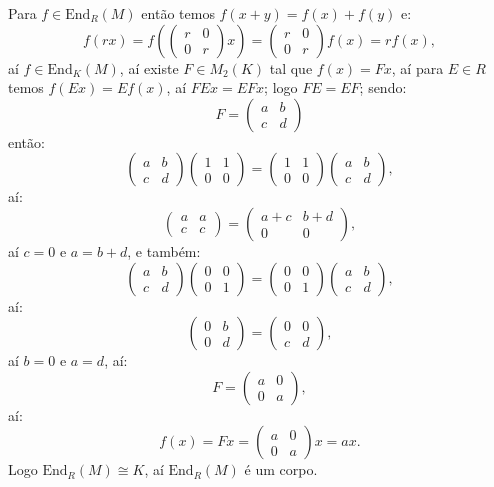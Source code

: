 \documentclass[10pt,a4paper]{article}
\begin{document}
\medskip
\noindent
Para $f\in\mathrm{End}_R(M)$ então temos $f(x+y)=f(x)+f(y)$ e:
\[
f(rx)=f\left(\begin{pmatrix}
r&0\\0&r
\end{pmatrix}x\right)=\begin{pmatrix}
r&0\\0&r
\end{pmatrix}f(x)=rf(x),
\]
aí $f\in\mathrm{End}_K(M)$, aí existe $F\in M_2(K)$ tal que $f(x)=Fx$, aí para $E\in R$ temos $f(Ex)=Ef(x)$, aí $FEx=EFx$; logo $FE=EF$; sendo:
\[
F=\begin{pmatrix}
a&b\\c&d
\end{pmatrix}
\]
então:
\[
\begin{pmatrix}
a&b\\c&d
\end{pmatrix}\begin{pmatrix}
1&1\\0&0
\end{pmatrix}=\begin{pmatrix}
1&1\\0&0
\end{pmatrix}\begin{pmatrix}
a&b\\c&d
\end{pmatrix},
\]
aí:
\[
\begin{pmatrix}
a&a\\c&c
\end{pmatrix}=
\begin{pmatrix}
a+c&b+d\\0&0
\end{pmatrix},
\]
aí $c=0$ e $a=b+d$, e também:
\[
\begin{pmatrix}
a&b\\c&d
\end{pmatrix}\begin{pmatrix}
0&0\\0&1
\end{pmatrix}=\begin{pmatrix}
0&0\\0&1
\end{pmatrix}\begin{pmatrix}
a&b\\c&d
\end{pmatrix},
\]
aí:
\[
\begin{pmatrix}
0&b\\0&d
\end{pmatrix}=
\begin{pmatrix}
0&0\\c&d
\end{pmatrix},
\]
aí $b=0$ e $a=d$, aí:
\[
F=\begin{pmatrix}
a&0\\0&a
\end{pmatrix},
\]
aí:
\[
f(x)=Fx=\begin{pmatrix}
a&0\\0&a
\end{pmatrix}x=ax.
\]
Logo $\mathrm{End}_R(M)\cong K$, aí $\mathrm{End}_R(M)$ é um corpo.
\end{document}
